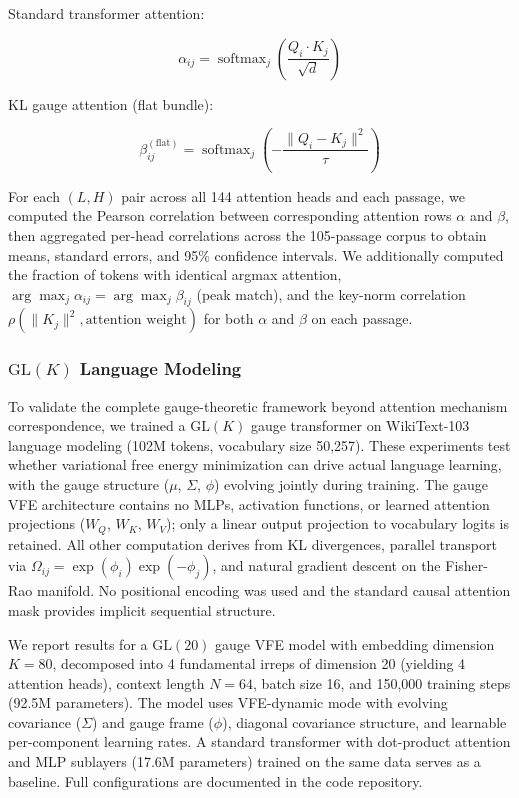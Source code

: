\documentclass[twoside,11pt]{article}
\begin{document}
Standard transformer attention:

\begin{equation}
\alpha_{ij} = \operatorname{softmax}_j\!\left( \frac{Q_i \cdot K_j}{\sqrt{d}} \right)
\end{equation}

KL gauge attention (flat bundle):

\begin{equation}
\beta^{(\mathrm{flat})}_{ij} = \operatorname{softmax}_j\!\left( -\frac{\|Q_i - K_j\|^2}{\tau} \right)
\end{equation}

For each $(L,H)$ pair across all 144 attention heads and each passage, we computed the Pearson correlation between corresponding attention rows $\alpha$ and $\beta$, then aggregated per-head correlations across the 105-passage corpus to obtain means, standard errors, and 95\% confidence intervals. We additionally computed the fraction of tokens with identical argmax attention, $\arg\max_j \alpha_{ij} = \arg\max_j \beta_{ij}$ (peak match), and the key-norm correlation $\rho(\|K_j\|^2, \text{attention weight})$ for both $\alpha$ and $\beta$ on each passage.

\subsubsection{$\mathrm{GL}(K)$ Language Modeling}
\label{sec:experimental_design_glk}

To validate the complete gauge-theoretic framework beyond attention mechanism correspondence, we trained a $\mathrm{GL}(K)$ gauge transformer on WikiText-103 language modeling (102M tokens, vocabulary size 50,257). These experiments test whether variational free energy minimization can drive actual language learning, with the gauge structure ($\mu$, $\Sigma$, $\phi$) evolving jointly during training. The gauge VFE architecture contains no MLPs, activation functions, or learned attention projections ($W_Q$, $W_K$, $W_V$); only a linear output projection to vocabulary logits is retained. All other computation derives from KL divergences, parallel transport via $\Omega_{ij} = \exp(\phi_i) \exp(-\phi_j)$, and natural gradient descent on the Fisher-Rao manifold. No positional encoding was used and the standard causal attention mask provides implicit sequential structure.

We report results for a $\mathrm{GL}(20)$ gauge VFE model with embedding dimension $K = 80$, decomposed into 4 fundamental irreps of dimension 20 (yielding 4 attention heads), context length $N = 64$, batch size 16, and 150{,}000 training steps (92.5M parameters). The model uses VFE-dynamic mode with evolving covariance ($\Sigma$) and gauge frame ($\phi$), diagonal covariance structure, and learnable per-component learning rates. A standard transformer with dot-product attention and MLP sublayers (17.6M parameters) trained on the same data serves as a baseline. Full configurations are documented in the code repository.
\end{document}
